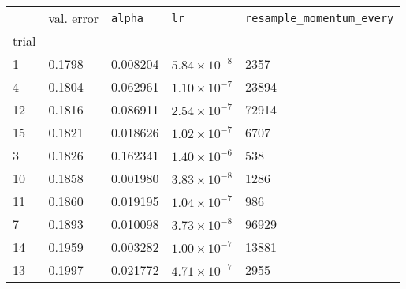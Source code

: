 \begin{tabular}{lp{2.3cm}p{2.3cm}p{2.3cm}p{2.3cm}}
\toprule
{} &  val. error &  \texttt{alpha} &         \texttt{lr} &  \texttt{resample\_momentum\_every} \\
trial &             &                 &                     &                                     \\
\midrule
1     &      0.1798 &        0.008204 & $5.84\times10^{-8}$ &                                2357 \\
4     &      0.1804 &        0.062961 & $1.10\times10^{-7}$ &                               23894 \\
12    &      0.1816 &        0.086911 & $2.54\times10^{-7}$ &                               72914 \\
15    &      0.1821 &        0.018626 & $1.02\times10^{-7}$ &                                6707 \\
3     &      0.1826 &        0.162341 & $1.40\times10^{-6}$ &                                 538 \\
10    &      0.1858 &        0.001980 & $3.83\times10^{-8}$ &                                1286 \\
11    &      0.1860 &        0.019195 & $1.04\times10^{-7}$ &                                 986 \\
7     &      0.1893 &        0.010098 & $3.73\times10^{-8}$ &                               96929 \\
14    &      0.1959 &        0.003282 & $1.00\times10^{-7}$ &                               13881 \\
13    &      0.1997 &        0.021772 & $4.71\times10^{-7}$ &                                2955 \\
\bottomrule
\end{tabular}
